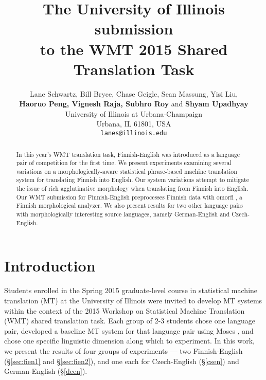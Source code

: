 \documentclass[11pt,a4paper]{article}
\title{The University of Illinois submission \\ to the WMT 2015 Shared Translation Task}
\author{Lane Schwartz, Bill Bryce, Chase Geigle, Sean Massung, Yisi Liu, \\
  {\bf Haoruo Peng, Vignesh Raja, Subhro Roy} and {\bf Shyam Upadhyay} \\
  University of Illinois at Urbana-Champaign \\
  Urbana, IL 61801, USA \\
  {\tt lanes@illinois.edu}
  }
\date{}
\begin{document}
\maketitle
{}




\begin{abstract}
In this year's WMT translation task, Finnish-English was introduced as a language pair of competition for the first time.
%
We present experiments examining several variations on a morphologically-aware statistical phrase-based machine translation system for translating Finnish into English.
%
Our system variations attempt to mitigate the issue of rich agglutinative morphology when translating from Finnish into English.
%
Our WMT submission for Finnish-English preprocesses Finnish data with omorfi \cite{omorfi}, a Finnish morphological analyzer.
%
We also present results for two other language pairs with morphologically interesting source languages, namely German-English and Czech-English.
\end{abstract}




\section{Introduction}


Students enrolled in the Spring 2015 graduate-level course in statistical machine translation (MT) at the University of Illinois were invited to develop MT systems within the context of the 2015 Workshop on Statistical Machine Translation (WMT) shared translation task.
%
Each group of 2-3 students chose one language pair, developed a baseline MT system for that language pair using Moses \cite{moses}, and chose one specific linguistic dimension along which to experiment.
%
In this work, we present the results of four groups of experiments --- two Finnish-English (\S\ref{sec:fien1} and \S\ref{sec:fien2}), and one each for Czech-English (\S\ref{csen}) and German-English (\S\ref{deen}). 
\end{document}
